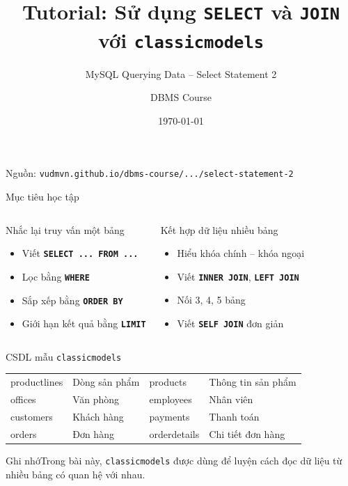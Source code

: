 \documentclass[aspectratio=169,11pt]{beamer}
\title[SELECT và JOIN]{Tutorial: Sử dụng \texttt{SELECT} và \texttt{JOIN} với \texttt{classicmodels}}
\subtitle{MySQL Querying Data -- Select Statement 2}
\author{DBMS Course}
\institute{Smart Logistics and Supply Chain Management Lab}
\date{\today}
\newcommand{\kw}[1]{\textbf{\texttt{#1}}}
\newcommand{\hint}[1]{\begin{block}{Ghi nhớ}#1\end{block}}
\newcommand{\sourceurl}{\footnotesize Nguồn: \texttt{vudmvn.github.io/dbms-course/.../select-statement-2}}
\begin{document}
\begin{frame}
  \titlepage
  \vspace{-0.7em}
  \begin{center}
    \sourceurl
  \end{center}
\end{frame}

\begin{frame}{Mục tiêu học tập}
\begin{columns}[T,onlytextwidth]
\begin{block}{Nhắc lại truy vấn một bảng}
\begin{itemize}
  \item Viết \kw{SELECT ... FROM ...}
  \item Lọc bằng \kw{WHERE}
  \item Sắp xếp bằng \kw{ORDER BY}
  \item Giới hạn kết quả bằng \kw{LIMIT}
\end{itemize}
\end{block}
\begin{block}{Kết hợp dữ liệu nhiều bảng}
\begin{itemize}
  \item Hiểu khóa chính -- khóa ngoại
  \item Viết \kw{INNER JOIN}, \kw{LEFT JOIN}
  \item Nối 3, 4, 5 bảng
  \item Viết \kw{SELF JOIN} đơn giản
\end{itemize}
\end{block}
\end{columns}
\end{frame}

\begin{frame}{CSDL mẫu \texttt{classicmodels}}
\begin{tabularx}{\textwidth}{>{\ttfamily}l X >{\ttfamily}l X}
\toprule
productlines & Dòng sản phẩm & products & Thông tin sản phẩm \\offices & Văn phòng & employees & Nhân viên \\customers & Khách hàng & payments & Thanh toán \\orders & Đơn hàng & orderdetails & Chi tiết đơn hàng \\
\bottomrule
\end{tabularx}
\vspace{0.8em}
\hint{Trong bài này, \texttt{classicmodels} được dùng để luyện cách đọc dữ liệu từ nhiều bảng có quan hệ với nhau.}
\end{frame}
\end{document}
